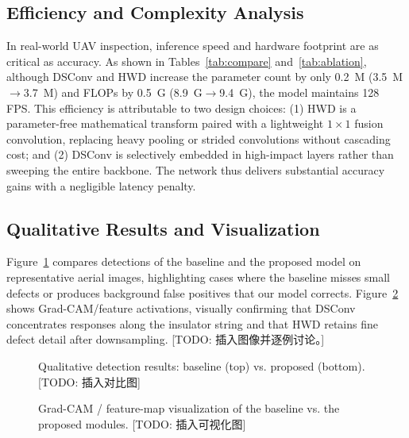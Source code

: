 \documentclass[sensors,article,submit,pdftex,moreauthors]{Definitions/mdpi}
\begin{document}
\subsection{Efficiency and Complexity Analysis}

In real-world UAV inspection, inference speed and hardware footprint are as critical as accuracy. As shown in Tables~\ref{tab:compare} and~\ref{tab:ablation}, although DSConv and HWD increase the parameter count by only 0.2~M (3.5~M$\rightarrow$3.7~M) and FLOPs by 0.5~G (8.9~G$\rightarrow$9.4~G), the model maintains 128 FPS. This efficiency is attributable to two design choices: (1) HWD is a parameter-free mathematical transform paired with a lightweight $1\times1$ fusion convolution, replacing heavy pooling or strided convolutions without cascading cost; and (2) DSConv is selectively embedded in high-impact layers rather than sweeping the entire backbone. The network thus delivers substantial accuracy gains with a negligible latency penalty.

\subsection{Qualitative Results and Visualization}

Figure~\ref{fig:qualitative} compares detections of the baseline and the proposed model on representative aerial images, highlighting cases where the baseline misses small defects or produces background false positives that our model corrects. Figure~\ref{fig:heatmap} shows Grad-CAM/feature activations, visually confirming that DSConv concentrates responses along the insulator string and that HWD retains fine defect detail after downsampling. [TODO: 插入图像并逐例讨论。]

\begin{figure}[H]
\centering
\caption{Qualitative detection results: baseline (top) vs. proposed (bottom). [TODO: 插入对比图]}
\label{fig:qualitative}
\end{figure}

\begin{figure}[H]
\centering
\caption{Grad-CAM / feature-map visualization of the baseline vs. the proposed modules. [TODO: 插入可视化图]}
\label{fig:heatmap}
\end{figure}
\end{document}
